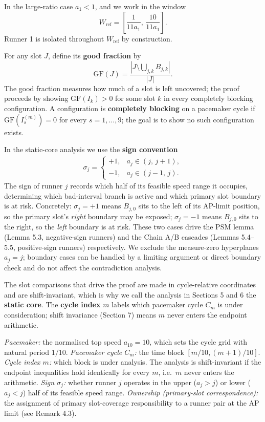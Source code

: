 \documentclass[12pt]{article}
\begin{document}
In the large-ratio case $a_1<1$, and we work in the window
\[
W_{\mathrm{ref}} = \left[\frac{1}{11a_1},\,\frac{10}{11a_1}\right].
\]
Runner 1 is isolated throughout $W_{\mathrm{ref}}$ by construction.

For any slot $J$, define its \textbf{good fraction} by
\[
\mathrm{GF}(J) = \frac{|J\setminus\bigcup_{j,k}B_{j,k}|}{|J|}.
\]
The good fraction measures how much of a slot is left uncovered; the proof proceeds by
showing $\mathrm{GF}(I_k)>0$ for some slot $k$ in every completely blocking configuration.
A configuration is \textbf{completely blocking} on a pacemaker cycle if $\mathrm{GF}(I_s^{(m)})=0$
for every $s=1,\ldots,9$; the goal is to show no such configuration exists.

In the static-core analysis we use the \textbf{sign convention}
\begin{align*}
\sigma_j =
  \begin{cases}
    +1, & a_j\in(j,\,j+1),\\
    -1, & a_j\in(j-1,\,j).
  \end{cases}
\end{align*}
The sign of runner $j$ records which half of its feasible speed range it occupies,
determining which bad-interval branch is active and which primary slot boundary is at
risk. Concretely: $\sigma_j=+1$ means $B_{j,0}$ sits to the left of its AP-limit
position, so the primary slot's \emph{right} boundary may be exposed; $\sigma_j=-1$ means
$B_{j,0}$ sits to the right, so the \emph{left} boundary is at risk. These two cases drive
the PSM lemma (Lemma 5.3, negative-sign runners) and the Chain A/B cascades
(Lemmas 5.4--5.5, positive-sign runners) respectively.
We exclude the measure-zero hyperplanes $a_j=j$; boundary cases can be handled by a
limiting argument or direct boundary check and do not affect the contradiction analysis.

The slot comparisons that drive the proof are made in cycle-relative coordinates and are
shift-invariant, which is why we call the analysis in Sections 5 and 6 the \textbf{static core}. The \textbf{cycle index} $m$ labels which pacemaker cycle $C_m$ is under consideration;
shift invariance (Section 7) means $m$ never enters the endpoint arithmetic.

\begin{remark}\label{rem:21}
\emph{Pacemaker:} the normalised top speed $a_{10}=10$, which sets the cycle grid with
natural period $1/10$.
\emph{Pacemaker cycle $C_m$:} the time block $[m/10,(m+1)/10]$.
\emph{Cycle index $m$:} which block is under analysis. The analysis is shift-invariant if
the endpoint inequalities hold identically for every $m$, i.e.\ $m$ never enters
the arithmetic.
\emph{Sign $\sigma_j$:} whether runner $j$ operates in the upper ($a_j>j$) or lower
($a_j<j$) half of its feasible speed range.
\emph{Ownership (primary-slot correspondence):} the assignment of primary slot-coverage
responsibility to a runner pair at the AP limit (see Remark 4.3).

\end{remark}
\end{document}
